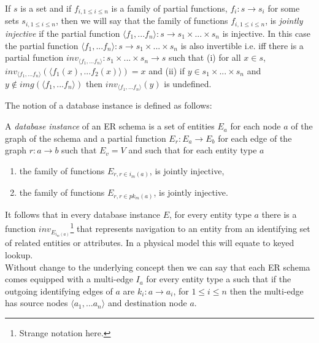 \documentclass[10pt,a4paper]{article}
\newcommand{\genericmodel}{\mathcal{M}}
\renewcommand{\genericmodel}{{m}}
\newcommand{\veee}{v}
\newcommand{\Veee}{V}
\newcommand{\iedges}[2] [\genericmodel]{i_{#1}(#2)}
\newcommand{\pk}[2] [\genericmodel]{pk_{#1}(#2)}
\newcommand{\term}[1]{\textit{{#1}}}
\begin{document}
\begin{definition}
If $s$ is a set and if $f_{i, 1\leq i \leq n}$ is a family of partial functions, $f_i: s \rightarrow s_i$   for some sets $s_{i, 1 \leq i \leq n}$,  then
we will say that the family of functions $f_{i, 1\leq i \leq n}$, is \term{jointly injective} if the partial function $\langle f_1,...f_n\rangle: s \rightarrow
s_1 \times ... \times s_n $ is injective. In this case the partial function $\langle f_1,...f_n\rangle: s \rightarrow
s_1 \times ... \times s_n $ is also invertible i.e. iff there is a partial function $inv_{\langle f_1,...f_n\rangle} : s_1 \times ... \times s_n \rightarrow s$ such that
(i) for all $x \in s$, $inv_{\langle f_1,...f_n\rangle}(\langle f_1(x),...f_2(x) \rangle ) = x$ and (ii) if $y \in s_1 \times ... \times s_n $ and
$y \notin img(\langle f_1,...f_n\rangle)$ then $inv_{\langle f_1,...f_n\rangle}(y)$ is undefined. \\
\end{definition}
\noindent The notion of a database instance is defined as follows:
\begin{definition}
\noindent A \term{database instance}  of an ER schema is
a set of entities $E_a$ for each node $a$ of the graph of the schema and 
a partial function $E_r : E_a \rightarrow E_b$ for each edge of the graph $r:a \rightarrow b$ 
such that $E_\veee=\Veee$
and such that 
for each entity type $a$ 
\begin{enumerate}
\item
the family of functions $E_{r, r \in \iedges{a}}$, is jointly injective,
\item
the family of functions $E_{r, r \in \pk{a}}$, is jointly injective.
\end{enumerate}
\end{definition}

\noindent It follows that in every database instance $E$, for every entity type $a$ there is a function 
$inv_{E_{\iedges{a}}}$\footnote{Strange notation here.}  that represents navigation to an entity from an identifying set of related entities or attributes. 
In a physical model this will equate to keyed lookup. \\

\noindent Without change to the underlying concept then we can say that each ER schema comes equipped with a multi-edge $I_a$ for every entity type a such that if 
the outgoing identifying edges of $a$ are $k_i: a \rightarrow a_i$, for $1 \leq i \leq n$  then the multi-edge has source nodes $\langle a_1,...a_n\rangle$ and destination node $a$.  
\end{document}
